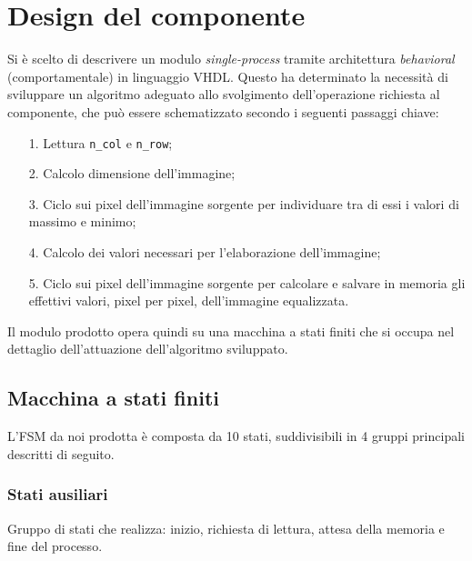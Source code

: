 \documentclass{article}
\begin{document}
\section{Design del componente} %
Si è scelto di descrivere un modulo \emph{single-process} tramite architettura \emph{behavioral} (comportamentale) in linguaggio VHDL.
Questo ha determinato la necessità di sviluppare un algoritmo adeguato allo svolgimento dell’operazione richiesta al componente, 
che può essere schematizzato secondo i seguenti passaggi chiave:
\begin{itemize}
    \item   [1.]    Lettura \texttt{n\_col} e \texttt{n\_row};
    \item   [2.]    Calcolo dimensione dell'immagine;
    \item   [3.]    Ciclo sui pixel dell’immagine sorgente per individuare tra di essi i valori di massimo e minimo;
    \item   [4.]    Calcolo dei valori necessari per l’elaborazione dell’immagine;
    \item   [5.]    Ciclo sui pixel dell’immagine sorgente per calcolare e salvare in memoria gli effettivi valori, pixel per pixel, dell’immagine equalizzata.
\end{itemize}

Il modulo prodotto opera quindi su una macchina a stati finiti che si occupa nel dettaglio dell’attuazione dell’algoritmo sviluppato.
\vspace{0,3cm}

\subsection{Macchina a stati finiti} %
L’FSM da noi prodotta è composta da 10 stati, suddivisibili in 4 gruppi principali descritti di seguito.

\subsubsection{Stati ausiliari} %
Gruppo di stati che realizza: inizio, richiesta di lettura, attesa della memoria e fine del processo.
\end{document}

